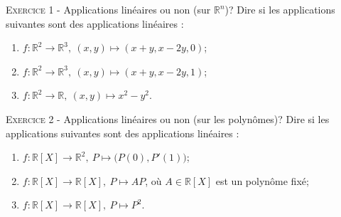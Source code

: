 

\newcommand{\mtn}{\mathbb{N}}
\newcommand{\mtns}{\mathbb{N}^*}
\newcommand{\mtz}{\mathbb{Z}}
\newcommand{\mtr}{\mathbb{R}}
\newcommand{\mtk}{\mathbb{K}}
\newcommand{\mtq}{\mathbb{Q}}
\newcommand{\mtc}{\mathbb{C}}
\newcommand{\mch}{\mathcal{H}}
\newcommand{\mcp}{\mathcal{P}}
\newcommand{\mcb}{\mathcal{B}}
\newcommand{\mcl}{\mathcal{L}}
\newcommand{\mcm}{\mathcal{M}}
\newcommand{\mcc}{\mathcal{C}}
\newcommand{\mcmn}{\mathcal{M}}
\newcommand{\mcmnr}{\mathcal{M}_n(\mtr)}
\newcommand{\mcmnk}{\mathcal{M}_n(\mtk)}
\newcommand{\mcsn}{\mathcal{S}_n}
\newcommand{\mcs}{\mathcal{S}}
\newcommand{\mcd}{\mathcal{D}}
\newcommand{\mcsns}{\mathcal{S}_n^{++}}
\newcommand{\glnk}{GL_n(\mtk)}
\newcommand{\mnr}{\mathcal{M}_n(\mtr)}
\DeclareMathOperator{\ch}{ch}
\DeclareMathOperator{\sh}{sh}
\DeclareMathOperator{\vect}{vect}
\DeclareMathOperator{\card}{card}
\DeclareMathOperator{\comat}{comat}
\DeclareMathOperator{\imv}{Im}
\DeclareMathOperator{\rang}{rg}
\DeclareMathOperator{\Fr}{Fr}
\DeclareMathOperator{\diam}{diam}
\DeclareMathOperator{\supp}{supp}
\newcommand{\veps}{\varepsilon}
\newcommand{\mcu}{\mathcal{U}}
\newcommand{\mcun}{\mcu_n}
\newcommand{\dis}{\displaystyle}
\newcommand{\croouv}{[\![}
\newcommand{\crofer}{]\!]}
\newcommand{\rab}{\mathcal{R}(a,b)}
\newcommand{\pss}[2]{\langle #1,#2\rangle}

 

\begin{center}\textsc{{\huge }}\end{center}



\vskip0.3cm\noindent\textsc{Exercice 1} - Applications linéaires ou non (sur $\mathbb R^n$)?
\vskip0.2cm
Dire si les applications suivantes sont des applications linéaires :
\begin{enumerate}
\item $f:\mathbb R^2\to\mathbb R^3,\ (x,y)\mapsto (x+y,x-2y,0)$;
\item $f:\mathbb R^2\to\mathbb R^3,\ (x,y)\mapsto (x+y,x-2y,1)$;
\item $f:\mathbb R^2\to\mathbb R,\ (x,y)\mapsto x^2-y^2$.
\end{enumerate}




\vskip0.3cm\noindent\textsc{Exercice 2} - Applications linéaires ou non (sur les polynômes)?
\vskip0.2cm
Dire si les applications suivantes sont des applications linéaires :
\begin{enumerate}
\item $f:\mathbb R[X]\to \mathbb R^2,\ P\mapsto \big(P(0),P'(1)\big)$;
\item $f:\mathbb R[X]\to \mathbb R[X],\ P\mapsto AP$, où $A\in\mathbb R[X]$ est un polynôme fixé;
\item $f:\mathbb R[X]\to\mathbb R[X],\ P\mapsto P^2$.
\end{enumerate}



